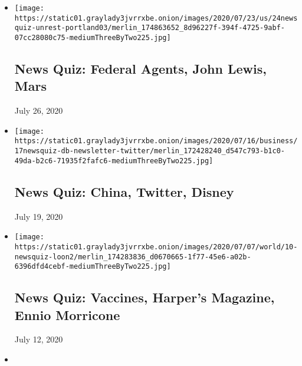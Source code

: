 \begin{itemize}
\item
  \href{https://www.nytimes3xbfgragh.onion/interactive/2020/07/24/briefing/federal-agents-john-lewis-mars-news-quiz.html}{}

  \texttt{[image: https://static01.graylady3jvrrxbe.onion/images/2020/07/23/us/24newsquiz-unrest-portland03/merlin\_174863652\_8d96227f-394f-4725-9abf-07cc28080c75-mediumThreeByTwo225.jpg]}

  \hypertarget{news-quiz-federal-agents-john-lewis-mars}{%
  \subsection{News Quiz: Federal Agents, John Lewis,
  Mars}\label{news-quiz-federal-agents-john-lewis-mars}}

  July 26, 2020
\item
  \href{https://www.nytimes3xbfgragh.onion/interactive/2020/07/17/briefing/china-twitter-disney-news-quiz.html}{}

  \texttt{[image: https://static01.graylady3jvrrxbe.onion/images/2020/07/16/business/17newsquiz-db-newsletter-twitter/merlin\_172428240\_d547c793-b1c0-49da-b2c6-71935f2fafc6-mediumThreeByTwo225.jpg]}

  \hypertarget{news-quiz-china-twitter-disney}{%
  \subsection{News Quiz: China, Twitter,
  Disney}\label{news-quiz-china-twitter-disney}}

  July 19, 2020
\item
  \href{https://www.nytimes3xbfgragh.onion/interactive/2020/07/10/briefing/vaccines-harpers-magazine-ennio-morricone-news-quiz.html}{}

  \texttt{[image: https://static01.graylady3jvrrxbe.onion/images/2020/07/07/world/10-newsquiz-loon2/merlin\_174283836\_d0670665-1f77-45e6-a02b-6396dfd4cebf-mediumThreeByTwo225.jpg]}

  \hypertarget{news-quiz-vaccines-harpers-magazine-ennio-morricone}{%
  \subsection{News Quiz: Vaccines, Harper's Magazine, Ennio
  Morricone}\label{news-quiz-vaccines-harpers-magazine-ennio-morricone}}

  July 12, 2020
\item
  \href{https://www.nytimes3xbfgragh.onion/interactive/2020/07/03/briefing/russia-carl-reiner-supreme-court-news-quiz.html}{}


\end{itemize}
